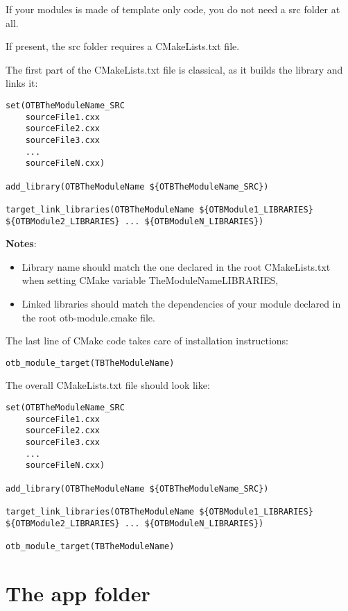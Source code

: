 If your modules is made of template only code, you do not need a src folder at all.

If present, the src folder requires a CMakeLists.txt file.

The first part of the CMakeLists.txt file is classical, as it builds the library and links it: 

\begin{verbatim}
set(OTBTheModuleName_SRC
    sourceFile1.cxx
    sourceFile2.cxx
    sourceFile3.cxx
    ...
    sourceFileN.cxx)

add_library(OTBTheModuleName ${OTBTheModuleName_SRC})

target_link_libraries(OTBTheModuleName ${OTBModule1_LIBRARIES} ${OTBModule2_LIBRARIES} ... ${OTBModuleN_LIBRARIES})
\end{verbatim}

\textbf{Notes}: 

\begin{itemize}
       \item  Library name should match the one declared in the root CMakeLists.txt when setting CMake variable TheModuleName\textunderscore LIBRARIES,   
       \item  Linked libraries should match the dependencies of your module declared in the root otb-module.cmake file. 
\end{itemize}

The last line of CMake code takes care of installation instructions: 
\begin{verbatim}
otb_module_target(TBTheModuleName)
\end{verbatim}

The overall CMakeLists.txt file should look like: 

\begin{verbatim}
set(OTBTheModuleName_SRC
    sourceFile1.cxx
    sourceFile2.cxx
    sourceFile3.cxx
    ...
    sourceFileN.cxx)

add_library(OTBTheModuleName ${OTBTheModuleName_SRC})

target_link_libraries(OTBTheModuleName ${OTBModule1_LIBRARIES} ${OTBModule2_LIBRARIES} ... ${OTBModuleN_LIBRARIES})

otb_module_target(TBTheModuleName)
\end{verbatim}

\section{The app folder }

